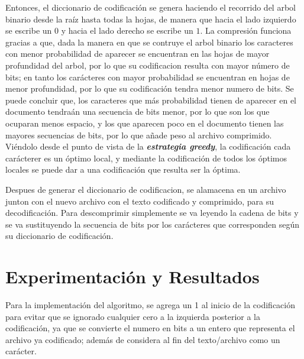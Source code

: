 \documentclass[12pt,twoside]{article}
\begin{document}
Entonces, el diccionario de codificaci\'on se genera haciendo el recorrido del arbol binario desde la ra\'iz hasta todas la hojas, de manera que hacia el lado izquierdo se escribe un $0$ y hacia el lado derecho se escribe un $1$. La compresi\'on funciona gracias a que, dada la manera en que se contruye el arbol binario los caracteres con menor probabilidad de aparecer se encuentran en las hojas de mayor profundidad del arbol, por lo que su codificacion resulta con mayor n\'umero de bits; en tanto los car\'acteres con mayor probabilidad se encuentran en hojas de menor profundidad, por lo que su codificaci\'on tendra menor numero de bits. Se puede concluir que, los caracteres que m\'as probabilidad tienen de aparecer en el documento tendra\'an una secuencia de bits menor, por lo que son los que ocuparan menos espacio, y los que aparecen poco en el documento tienen las mayores secuencias de bits, por lo que a\~nade peso al archivo comprimido. Vi\'endolo desde el punto de vista de la \textit{\textbf{estrategia greedy}}, la codificaci\'on cada car\'acterer es un \'optimo local, y mediante la codificaci\'on de todos los \'optimos locales se puede dar a una codificaci\'on que resulta ser la \'optima.

Despues de generar el diccionario de codificacion, se alamacena en un archivo junton con el nuevo archivo con el texto codificado y comprimido, para su decodificaci\'on. Para descomprimir simplemente se va leyendo la cadena de bits y se va sustituyendo la secuencia de bits por los car\'acteres que corresponden seg\'un su diccionario de codificaci\'on.

\newpage
\vfill
\clearpage

\section{Experimentaci\'on y Resultados}

Para la implementaci\'on del algoritmo, se agrega un 1 al inicio de la codificaci\'on para evitar que se ignorado cualquier cero a la izquierda posterior a la codificaci\'on, ya que se convierte el numero en bits a un entero que representa el archivo ya codificado; adem\'as de considera al fin del texto/archivo como un car\'acter.
\end{document}
